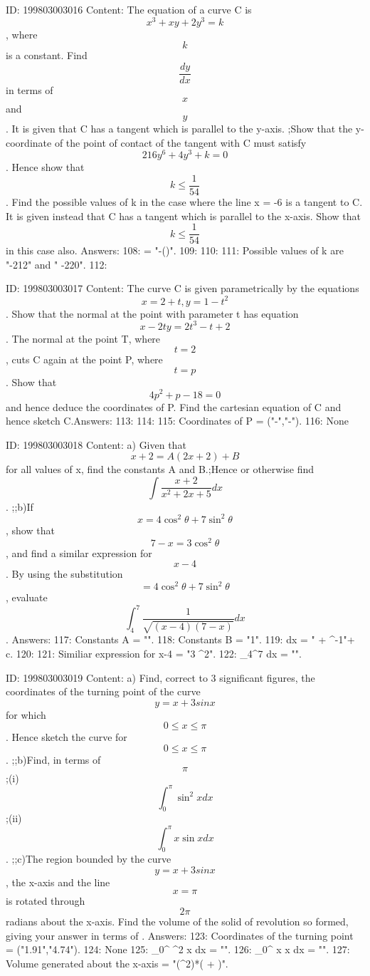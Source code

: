 \documentclass{article}
\begin{document}
ID: 199803003016
Content:
The equation of a curve C is $$x^3 + xy + 2 y^3 = k$$, where $$k$$ is a constant. Find  $$\frac{dy}{dx}$$ in terms of $$x$$ and $$y$$. It is given that C has a tangent which is parallel to the y-axis. ;Show that the y-coordinate of the point of contact of the tangent with C must satisfy $$216 y^6 + 4 y^3 + k = 0$$. Hence show that  $$k \leq \frac{1}{54}$$. Find the possible values of k in the case where the line x = -6 is a tangent to C. It is given instead that C has a tangent which is parallel to the x-axis. Show that $$k \leq \frac{1}{54}$$ in this case also. Answers:
108:  = "-()".
109: 
110: 
111: Possible values of k are "-212" and " -220".
112: 

ID: 199803003017
Content:
The curve C is given parametrically by the equations $$x = 2 + t, y = 1 - t^2$$. Show that the normal at the point with parameter t has equation $$x - 2ty = 2 t^3 - t + 2$$. The normal at the point T, where $$t = 2$$, cuts C again at the point P, where $$t = p$$. Show that $$4 p^2 + p - 18 = 0$$ and hence deduce the coordinates of P. Find the cartesian equation of C and hence sketch C.Answers:
113: 
114: 
115: Coordinates of P = ("-","-").
116: None

ID: 199803003018
Content:
a)  Given that $$x + 2 = A (2x + 2) + B$$ for all values of x, find the constants A and B.;Hence or otherwise find $$\int \frac{x + 2}{x^2 + 2x + 5} dx$$. ;;b)If  $$x = 4 {\cos}^2 \theta + 7 {\sin}^2 \theta$$, show that $$7 - x = 3 {\cos}^2 \theta$$, and find a similar expression for $$x - 4$$. By using the substitution $$= 4 {\cos}^2 \theta + 7 {\sin}^2 \theta$$, evaluate $$\int^7_4 \frac{1}{\sqrt{{ ( x - 4 ) ( 7 - x ) }}} dx$$. Answers:
117: Constants A = "".
118: Constants B = "1".
119: \int {} dx = "  +  \tan^{-1}{}"+ c.
120: 
121: Similiar expression for x-4 = "3 \sin^{2}{\theta}".
122: \int_4^7  dx = "\pi".

ID: 199803003019
Content:
a) Find, correct to 3 significant figures, the coordinates of the turning point of the curve $$y = x + 3 sin x$$ for which $$0 \leq x \leq \pi$$. Hence sketch the curve for $$0 \leq x \leq \pi$$. ;;b)Find, in terms of $$\pi$$ ;(i)$$\int^{\pi}_0 {\sin}^2 x dx$$ ;(ii)$$\int^{\pi}_0 x \sin x dx$$. ;;c)The region bounded by the curve $$y = x + 3 sin x$$, the x-axis and the line $$x = \pi$$ is rotated through $$2\pi$$ radians about the x-axis. Find the volume of the solid of revolution so formed, giving your answer in terms of  . Answers:
123: Coordinates of the turning point = ("1.91","4.74").
124: None
125: \int_0^{\pi} \sin^{2} x dx = "".
126: \int_0^{\pi} x \sin x dx = "\pi".
127: Volume generated about the x-axis = "(\pi^2)*( + )".
\end{document}
